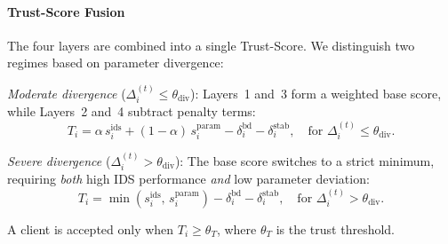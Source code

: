 \paragraph{Trust-Score Fusion} The four layers are combined into a single Trust-Score. We distinguish two regimes based on parameter divergence:

\emph{Moderate divergence} ($\Delta_i^{(t)} \le \theta_{\text{div}}$): Layers~1 and~3 form a weighted base score, while Layers~2 and~4 subtract penalty terms:
\begin{equation}
    T_i = \alpha\, s_i^{\text{ids}} + (1{-}\alpha)\, s_i^{\text{param}} - \delta_i^{\text{bd}} - \delta_i^{\text{stab}}, \quad \text{for } \Delta_i^{(t)} \le \theta_{\text{div}}.
\label{eq:trust-normal}
\end{equation}

\emph{Severe divergence} ($\Delta_i^{(t)} > \theta_{\text{div}}$): The base score switches to a strict minimum, requiring \emph{both} high IDS performance \emph{and} low parameter deviation:
\begin{equation}
    T_i = \min(s_i^{\text{ids}},\, s_i^{\text{param}}) - \delta_i^{\text{bd}} - \delta_i^{\text{stab}}, \quad \text{for } \Delta_i^{(t)} > \theta_{\text{div}}.
\label{eq:trust-strict}
\end{equation}

A client is accepted only when $T_i \ge \theta_T$, where $\theta_T$ is the trust threshold.

